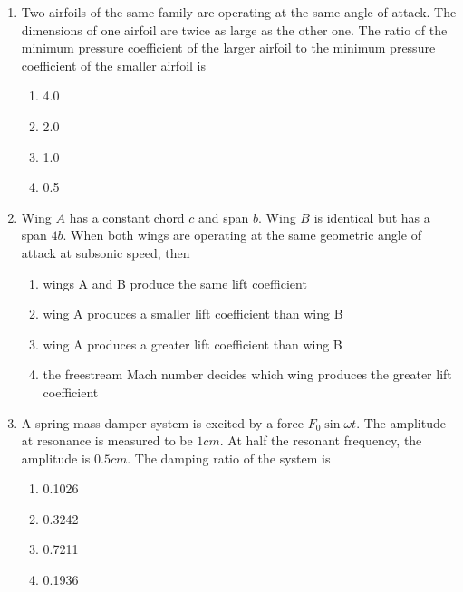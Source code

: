 \documentclass[journal]{IEEEtran}
\begin{document}
\begin{enumerate}
    \item Two airfoils of the same family are operating at the same angle of attack. The
    dimensions of one airfoil are twice as large as the other one. The ratio of the
    minimum pressure coefficient of the larger airfoil to the minimum pressure coefficient
    of the smaller airfoil is

    \begin{multicols}{4}
        \begin{enumerate}
            \item 4.0
            \item 2.0
            \item 1.0
            \item 0.5
        \end{enumerate}
    \end{multicols}

    \item Wing $A$ has a constant chord $c$ and span $b$. Wing $B$ is identical but has a span
    $4b$. When both wings are operating at the same geometric angle of attack at subsonic speed, then

    \begin{enumerate}
        \item wings A and B produce the same lift coefficient
        \item wing A produces a smaller lift coefficient than wing B
        \item wing A produces a greater lift coefficient than wing B
        \item the freestream Mach number decides which wing produces the greater lift coefficient
    \end{enumerate}

    \item A spring-mass damper system is excited by a force $F_0\sin\omega t$. The amplitude at resonance
    is measured to be $1 cm$. At half the resonant frequency, the amplitude is $0.5 cm$. The damping ratio
    of the system is

    \begin{multicols}{4}
        \begin{enumerate}
            \item 0.1026
            \item 0.3242
            \item 0.7211
            \item 0.1936
        \end{enumerate}
    \end{multicols}


\end{enumerate}
\end{document}
